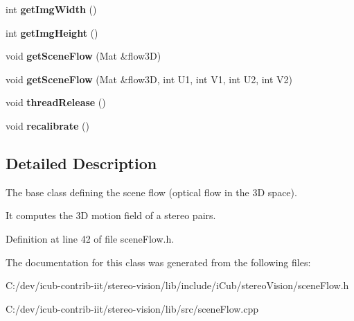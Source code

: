 \begin{DoxyCompactItemize}
\item 
int {\bfseries get\+Img\+Width} ()\label{classSceneFlow_a0844d30b0f1c10828f2144eb446e99fb}

\item 
int {\bfseries get\+Img\+Height} ()\label{classSceneFlow_a3c0fbe6df132fba94a0b24a8d1e90661}

\item 
void {\bfseries get\+Scene\+Flow} (Mat \&flow3\+D)\label{classSceneFlow_a8920f6b49c46d524fa543ac1e55c18e8}

\item 
void {\bfseries get\+Scene\+Flow} (Mat \&flow3\+D, int U1, int V1, int U2, int V2)\label{classSceneFlow_a82e1c079533882d4662fa29853d02f76}

\item 
void {\bfseries thread\+Release} ()\label{classSceneFlow_a999d87ea72266a0fc258b94a95fa48ec}

\item 
void {\bfseries recalibrate} ()\label{classSceneFlow_aecfc668fbb7d6800010abfe424a37aae}

\end{DoxyCompactItemize}


\subsection{Detailed Description}
The base class defining the scene flow (optical flow in the 3\+D space). 

It computes the 3\+D motion field of a stereo pairs. 

Definition at line 42 of file scene\+Flow.\+h.



The documentation for this class was generated from the following files\+:\begin{DoxyCompactItemize}
\item 
C\+:/dev/icub-\/contrib-\/iit/stereo-\/vision/lib/include/i\+Cub/stereo\+Vision/scene\+Flow.\+h\item 
C\+:/dev/icub-\/contrib-\/iit/stereo-\/vision/lib/src/scene\+Flow.\+cpp\end{DoxyCompactItemize}
